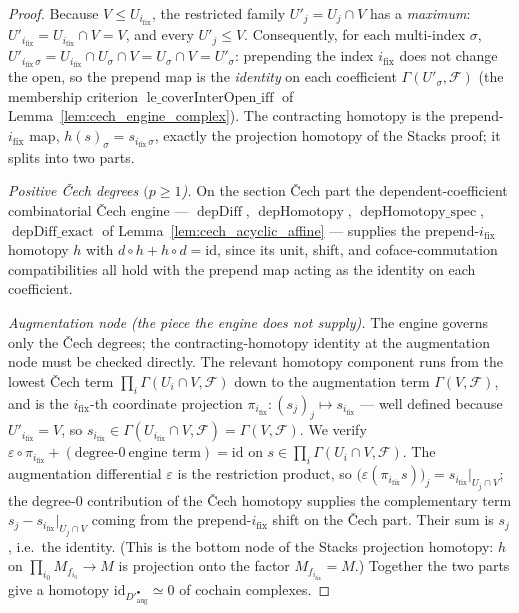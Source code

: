 \begin{proof}
  Because \(V \le U_{i_{\mathrm{fix}}}\), the restricted family \(U'_j = U_j \cap V\) has a
  \emph{maximum}: \(U'_{i_{\mathrm{fix}}} = U_{i_{\mathrm{fix}}} \cap V = V\), and every
  \(U'_j \le V\). Consequently, for each multi-index \(\sigma\),
  \(U'_{i_{\mathrm{fix}}\,\sigma} = U_{i_{\mathrm{fix}}} \cap U_\sigma \cap V = U_\sigma \cap
  V = U'_\sigma\): prepending the index \(i_{\mathrm{fix}}\) does not change the open, so the
  prepend map is the \emph{identity} on each coefficient \(\Gamma(U'_\sigma, \mathcal{F})\)
  (the membership criterion \(\operatorname{le\_coverInterOpen\_iff}\) of
  Lemma~\ref{lem:cech_engine_complex}). The contracting homotopy is the prepend-\(i_{\mathrm{fix}}\)
  map, \(h(s)_\sigma = s_{i_{\mathrm{fix}}\,\sigma}\), exactly the projection homotopy of the
  Stacks proof; it splits into two parts.

  \emph{Positive {\v C}ech degrees \((p \ge 1\)).} On the section {\v C}ech part the
  dependent-coefficient combinatorial {\v C}ech engine --- \(\operatorname{depDiff}\),
  \(\operatorname{depHomotopy}\), \(\operatorname{depHomotopy\_spec}\),
  \(\operatorname{depDiff\_exact}\) of Lemma~\ref{lem:cech_acyclic_affine} --- supplies the
  prepend-\(i_{\mathrm{fix}}\) homotopy \(h\) with
  \(d \circ h + h \circ d = \mathrm{id}\), since its unit, shift, and coface-commutation
  compatibilities all hold with the prepend map acting as the identity on each coefficient.

  \emph{Augmentation node (the piece the engine does not supply).} The engine governs only the
  {\v C}ech degrees; the contracting-homotopy identity at the augmentation node must be checked
  directly. The relevant homotopy component runs from the lowest {\v C}ech term
  \(\prod_i \Gamma(U_i \cap V, \mathcal{F})\) down to the augmentation term
  \(\Gamma(V, \mathcal{F})\), and is the \(i_{\mathrm{fix}}\)-th coordinate projection
  \(\pi_{i_{\mathrm{fix}}} : (s_j)_j \mapsto s_{i_{\mathrm{fix}}}\) --- well defined because
  \(U'_{i_{\mathrm{fix}}} = V\), so \(s_{i_{\mathrm{fix}}} \in \Gamma(U_{i_{\mathrm{fix}}} \cap V,
  \mathcal{F}) = \Gamma(V, \mathcal{F})\). We verify
  \(\varepsilon \circ \pi_{i_{\mathrm{fix}}} + (\text{degree-}0\ \text{engine term}) = \mathrm{id}\)
  on \(s \in \prod_i \Gamma(U_i \cap V, \mathcal{F})\). The augmentation differential
  \(\varepsilon\) is the restriction product, so
  \(\bigl(\varepsilon(\pi_{i_{\mathrm{fix}}} s)\bigr)_j = s_{i_{\mathrm{fix}}}|_{U_j \cap V}\); the
  degree-\(0\) contribution of the {\v C}ech homotopy supplies the complementary term
  \(s_j - s_{i_{\mathrm{fix}}}|_{U_j \cap V}\) coming from the prepend-\(i_{\mathrm{fix}}\) shift on
  the {\v C}ech part. Their sum is \(s_j\), i.e.\ the identity. (This is the bottom node of the
  Stacks projection homotopy: \(h\) on \(\prod_{i_0} M_{f_{i_0}} \to M\) is projection onto the
  factor \(M_{f_{i_{\mathrm{fix}}}} = M\).) Together the two parts give a homotopy
  \(\mathrm{id}_{D'^\bullet_{\mathrm{aug}}} \simeq 0\) of cochain complexes.
\end{proof}

